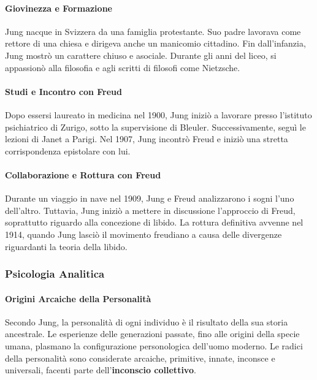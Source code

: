 \documentclass{subfiles}\
\begin{document}
\paragraph*{Giovinezza e Formazione}
Jung nacque in Svizzera da una famiglia protestante. Suo padre lavorava come rettore di una 
chiesa e dirigeva anche un manicomio cittadino. Fin dall'infanzia, Jung mostrò un carattere 
chiuso e asociale. Durante gli anni del liceo, si appassionò alla filosofia e agli scritti di 
filosofi come Nietzsche.\\

\paragraph*{Studi e Incontro con Freud}
Dopo essersi laureato in medicina nel 1900, Jung iniziò a lavorare presso l'istituto 
psichiatrico di Zurigo, sotto la supervisione di Bleuler. Successivamente, seguì le lezioni di 
Janet a Parigi. Nel 1907, Jung incontrò Freud e iniziò una stretta corrispondenza epistolare con lui.\\

\paragraph*{Collaborazione e Rottura con Freud}
Durante un viaggio in nave nel 1909, Jung e Freud analizzarono i sogni l'uno dell'altro. 
Tuttavia, Jung iniziò a mettere in discussione l'approccio di Freud, soprattutto riguardo 
alla concezione di libido. La rottura definitiva avvenne nel 1914, quando Jung lasciò il 
movimento freudiano a causa delle divergenze riguardanti la teoria della libido.\\

\subsubsection{Psicologia Analitica}

\paragraph*{Origini Arcaiche della Personalità}

Secondo Jung, la personalità di ogni individuo è il risultato della sua storia ancestrale. 
Le esperienze delle generazioni passate, fino alle origini della specie umana, plasmano la 
configurazione personologica dell'uomo moderno. Le radici della personalità sono considerate 
arcaiche, primitive, innate, inconsce e universali, facenti parte dell'\textbf{inconscio collettivo}.\\
\end{document}
